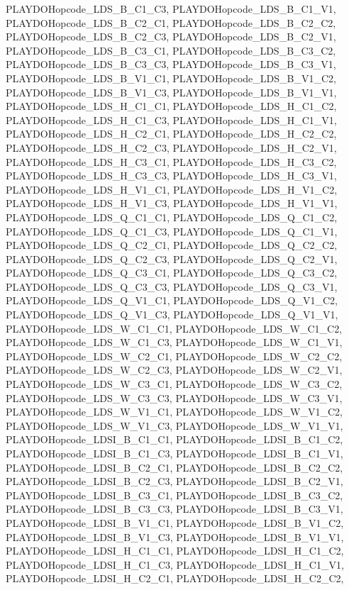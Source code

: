 PLAYDOHopcode\_\-LDS\_\-B\_\-C1\_\-C3, PLAYDOHopcode\_\-LDS\_\-B\_\-C1\_\-V1, PLAYDOHopcode\_\-LDS\_\-B\_\-C2\_\-C1, PLAYDOHopcode\_\-LDS\_\-B\_\-C2\_\-C2, PLAYDOHopcode\_\-LDS\_\-B\_\-C2\_\-C3, PLAYDOHopcode\_\-LDS\_\-B\_\-C2\_\-V1, PLAYDOHopcode\_\-LDS\_\-B\_\-C3\_\-C1, PLAYDOHopcode\_\-LDS\_\-B\_\-C3\_\-C2, PLAYDOHopcode\_\-LDS\_\-B\_\-C3\_\-C3, PLAYDOHopcode\_\-LDS\_\-B\_\-C3\_\-V1, PLAYDOHopcode\_\-LDS\_\-B\_\-V1\_\-C1, PLAYDOHopcode\_\-LDS\_\-B\_\-V1\_\-C2, PLAYDOHopcode\_\-LDS\_\-B\_\-V1\_\-C3, PLAYDOHopcode\_\-LDS\_\-B\_\-V1\_\-V1, PLAYDOHopcode\_\-LDS\_\-H\_\-C1\_\-C1, PLAYDOHopcode\_\-LDS\_\-H\_\-C1\_\-C2, PLAYDOHopcode\_\-LDS\_\-H\_\-C1\_\-C3, PLAYDOHopcode\_\-LDS\_\-H\_\-C1\_\-V1, PLAYDOHopcode\_\-LDS\_\-H\_\-C2\_\-C1, PLAYDOHopcode\_\-LDS\_\-H\_\-C2\_\-C2, PLAYDOHopcode\_\-LDS\_\-H\_\-C2\_\-C3, PLAYDOHopcode\_\-LDS\_\-H\_\-C2\_\-V1, PLAYDOHopcode\_\-LDS\_\-H\_\-C3\_\-C1, PLAYDOHopcode\_\-LDS\_\-H\_\-C3\_\-C2, PLAYDOHopcode\_\-LDS\_\-H\_\-C3\_\-C3, PLAYDOHopcode\_\-LDS\_\-H\_\-C3\_\-V1, PLAYDOHopcode\_\-LDS\_\-H\_\-V1\_\-C1, PLAYDOHopcode\_\-LDS\_\-H\_\-V1\_\-C2, PLAYDOHopcode\_\-LDS\_\-H\_\-V1\_\-C3, PLAYDOHopcode\_\-LDS\_\-H\_\-V1\_\-V1, PLAYDOHopcode\_\-LDS\_\-Q\_\-C1\_\-C1, PLAYDOHopcode\_\-LDS\_\-Q\_\-C1\_\-C2, PLAYDOHopcode\_\-LDS\_\-Q\_\-C1\_\-C3, PLAYDOHopcode\_\-LDS\_\-Q\_\-C1\_\-V1, PLAYDOHopcode\_\-LDS\_\-Q\_\-C2\_\-C1, PLAYDOHopcode\_\-LDS\_\-Q\_\-C2\_\-C2, PLAYDOHopcode\_\-LDS\_\-Q\_\-C2\_\-C3, PLAYDOHopcode\_\-LDS\_\-Q\_\-C2\_\-V1, PLAYDOHopcode\_\-LDS\_\-Q\_\-C3\_\-C1, PLAYDOHopcode\_\-LDS\_\-Q\_\-C3\_\-C2, PLAYDOHopcode\_\-LDS\_\-Q\_\-C3\_\-C3, PLAYDOHopcode\_\-LDS\_\-Q\_\-C3\_\-V1, PLAYDOHopcode\_\-LDS\_\-Q\_\-V1\_\-C1, PLAYDOHopcode\_\-LDS\_\-Q\_\-V1\_\-C2, PLAYDOHopcode\_\-LDS\_\-Q\_\-V1\_\-C3, PLAYDOHopcode\_\-LDS\_\-Q\_\-V1\_\-V1, PLAYDOHopcode\_\-LDS\_\-W\_\-C1\_\-C1, PLAYDOHopcode\_\-LDS\_\-W\_\-C1\_\-C2, PLAYDOHopcode\_\-LDS\_\-W\_\-C1\_\-C3, PLAYDOHopcode\_\-LDS\_\-W\_\-C1\_\-V1, PLAYDOHopcode\_\-LDS\_\-W\_\-C2\_\-C1, PLAYDOHopcode\_\-LDS\_\-W\_\-C2\_\-C2, PLAYDOHopcode\_\-LDS\_\-W\_\-C2\_\-C3, PLAYDOHopcode\_\-LDS\_\-W\_\-C2\_\-V1, PLAYDOHopcode\_\-LDS\_\-W\_\-C3\_\-C1, PLAYDOHopcode\_\-LDS\_\-W\_\-C3\_\-C2, PLAYDOHopcode\_\-LDS\_\-W\_\-C3\_\-C3, PLAYDOHopcode\_\-LDS\_\-W\_\-C3\_\-V1, PLAYDOHopcode\_\-LDS\_\-W\_\-V1\_\-C1, PLAYDOHopcode\_\-LDS\_\-W\_\-V1\_\-C2, PLAYDOHopcode\_\-LDS\_\-W\_\-V1\_\-C3, PLAYDOHopcode\_\-LDS\_\-W\_\-V1\_\-V1, PLAYDOHopcode\_\-LDSI\_\-B\_\-C1\_\-C1, PLAYDOHopcode\_\-LDSI\_\-B\_\-C1\_\-C2, PLAYDOHopcode\_\-LDSI\_\-B\_\-C1\_\-C3, PLAYDOHopcode\_\-LDSI\_\-B\_\-C1\_\-V1, PLAYDOHopcode\_\-LDSI\_\-B\_\-C2\_\-C1, PLAYDOHopcode\_\-LDSI\_\-B\_\-C2\_\-C2, PLAYDOHopcode\_\-LDSI\_\-B\_\-C2\_\-C3, PLAYDOHopcode\_\-LDSI\_\-B\_\-C2\_\-V1, PLAYDOHopcode\_\-LDSI\_\-B\_\-C3\_\-C1, PLAYDOHopcode\_\-LDSI\_\-B\_\-C3\_\-C2, PLAYDOHopcode\_\-LDSI\_\-B\_\-C3\_\-C3, PLAYDOHopcode\_\-LDSI\_\-B\_\-C3\_\-V1, PLAYDOHopcode\_\-LDSI\_\-B\_\-V1\_\-C1, PLAYDOHopcode\_\-LDSI\_\-B\_\-V1\_\-C2, PLAYDOHopcode\_\-LDSI\_\-B\_\-V1\_\-C3, PLAYDOHopcode\_\-LDSI\_\-B\_\-V1\_\-V1, PLAYDOHopcode\_\-LDSI\_\-H\_\-C1\_\-C1, PLAYDOHopcode\_\-LDSI\_\-H\_\-C1\_\-C2, PLAYDOHopcode\_\-LDSI\_\-H\_\-C1\_\-C3, PLAYDOHopcode\_\-LDSI\_\-H\_\-C1\_\-V1, PLAYDOHopcode\_\-LDSI\_\-H\_\-C2\_\-C1, PLAYDOHopcode\_\-LDSI\_\-H\_\-C2\_\-C2, 